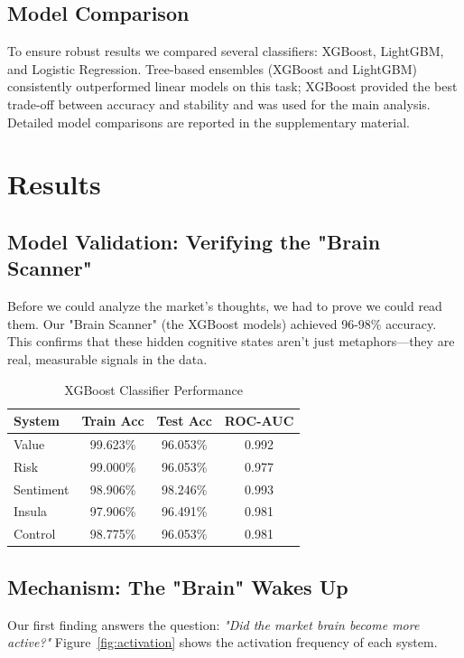 \documentclass[conference]{IEEEtran}
\begin{document}
\subsection{Model Comparison}

To ensure robust results we compared several classifiers: XGBoost, LightGBM, and Logistic Regression. Tree-based ensembles (XGBoost and LightGBM) consistently outperformed linear models on this task; XGBoost provided the best trade-off between accuracy and stability and was used for the main analysis. Detailed model comparisons are reported in the supplementary material.
\section{Results}

\subsection{Model Validation: Verifying the "Brain Scanner"}

Before we could analyze the market's thoughts, we had to prove we could read them. Our "Brain Scanner" (the XGBoost models) achieved 96-98\% accuracy. This confirms that these hidden cognitive states aren't just metaphors---they are real, measurable signals in the data.


\begin{table}[htbp]
\centering
\caption{XGBoost Classifier Performance}
\label{tab:performance}
\small
\begin{tabular}{@{}lccc@{}}
\toprule
\textbf{System} & \textbf{Train Acc} & \textbf{Test Acc} & \textbf{ROC-AUC} \\
\midrule
Value & 99.623\% & 96.053\% & 0.992 \\
Risk & 99.000\% & 96.053\% & 0.977 \\
Sentiment & 98.906\% & 98.246\% & 0.993 \\
Insula & 97.906\% & 96.491\% & 0.981 \\
Control & 98.775\% & 96.053\% & 0.981 \\
\bottomrule
\end{tabular}
\end{table}

\subsection{Mechanism: The "Brain" Wakes Up}
Our first finding answers the question: \textit{"Did the market brain become more active?"} Figure~\ref{fig:activation} shows the activation frequency of each system.
\end{document}
